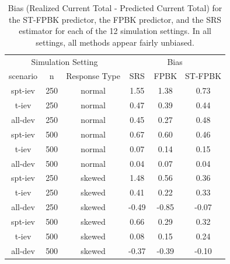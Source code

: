 \documentclass[]{article}    %
\begin{document}
\begin{table}[H]

\caption{\label{tab:simbiastab}Bias (Realized Current Total - Predicted Current Total) for the ST-FPBK predictor, the FPBK predictor, and the SRS estimator for each of the 12 simulation settings. In all settings, all methods appear fairly unbiased.}
\centering
\begin{tabular}[t]{cccccc}
\toprule
\multicolumn{3}{c}{Simulation Setting} & \multicolumn{3}{c}{Bias} \\
\cmidrule(l{3pt}r{3pt}){1-3} \cmidrule(l{3pt}r{3pt}){4-6}
scenario & n & Response Type & SRS & FPBK & ST-FPBK\\
\midrule
spt-iev & 250 & normal & 1.55 & 1.38 & 0.73\\
t-iev & 250 & normal & 0.47 & 0.39 & 0.44\\
all-dev & 250 & normal & 0.45 & 0.27 & 0.48\\
\midrule
spt-iev & 500 & normal & 0.67 & 0.60 & 0.46\\
t-iev & 500 & normal & 0.07 & 0.14 & 0.15\\
all-dev & 500 & normal & 0.04 & 0.07 & 0.04\\
\midrule
spt-iev & 250 & skewed & 1.48 & 0.56 & 0.36\\
t-iev & 250 & skewed & 0.41 & 0.22 & 0.33\\
all-dev & 250 & skewed & -0.49 & -0.85 & -0.07\\
\midrule
spt-iev & 500 & skewed & 0.66 & 0.29 & 0.32\\
t-iev & 500 & skewed & 0.08 & 0.15 & 0.24\\
all-dev & 500 & skewed & -0.37 & -0.39 & -0.10\\
\bottomrule
\end{tabular}
\end{table}
\end{document}
